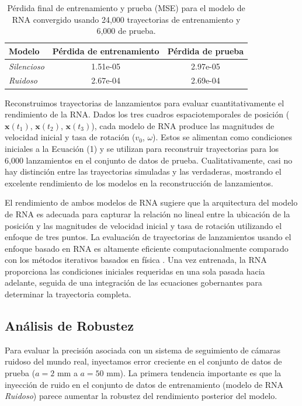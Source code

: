 \documentclass[12pt,a4paper]{article}
\begin{document}
\begin{table}[H]
\centering
\caption{Pérdida final de entrenamiento y prueba (MSE) para el modelo de RNA convergido usando 24,000 trayectorias de entrenamiento y 6,000 de prueba.}
\label{tab:perdida}
\begin{tabular}{@{}lcc@{}}
\toprule
Modelo & Pérdida de entrenamiento & Pérdida de prueba \\
\midrule
\textit{Silencioso} & 1.51e-05 & 2.97e-05 \\
\textit{Ruidoso} & 2.67e-04 & 2.69e-04 \\
\bottomrule
\end{tabular}
\end{table}

Reconstruimos trayectorias de lanzamientos para evaluar cuantitativamente el rendimiento de la RNA. Dados los tres cuadros espaciotemporales de posición ($\mathbf{x}(t_1)$, $\mathbf{x}(t_2)$, $\mathbf{x}(t_3)$), cada modelo de RNA produce las magnitudes de velocidad inicial y tasa de rotación ($v_0$, $\omega$). Estos se alimentan como condiciones iniciales a la Ecuación (1) y se utilizan para reconstruir trayectorias para los 6,000 lanzamientos en el conjunto de datos de prueba. Cualitativamente, casi no hay distinción entre las trayectorias simuladas y las verdaderas, mostrando el excelente rendimiento de los modelos en la reconstrucción de lanzamientos.

El rendimiento de ambos modelos de RNA sugiere que la arquitectura del modelo de RNA es adecuada para capturar la relación no lineal entre la ubicación de la posición y las magnitudes de velocidad inicial y tasa de rotación utilizando el enfoque de tres puntos. La evaluación de trayectorias de lanzamientos usando el enfoque basado en RNA es altamente eficiente computacionalmente comparado con los métodos iterativos basados en física \citep{aguirre2018}. Una vez entrenada, la RNA proporciona las condiciones iniciales requeridas en una sola pasada hacia adelante, seguida de una integración de las ecuaciones gobernantes para determinar la trayectoria completa.

\subsection{Análisis de Robustez}

Para evaluar la precisión asociada con un sistema de seguimiento de cámaras ruidoso del mundo real, inyectamos error creciente en el conjunto de datos de prueba ($a = 2$ mm a $a = 50$ mm). La primera tendencia importante es que la inyección de ruido en el conjunto de datos de entrenamiento (modelo de RNA \textit{Ruidoso}) parece aumentar la robustez del rendimiento posterior del modelo.
\end{document}
